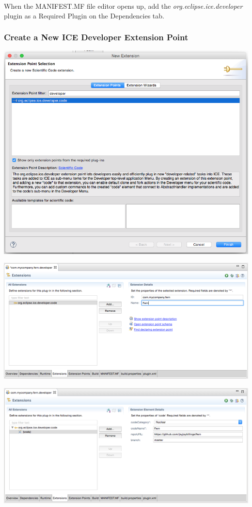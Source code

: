 \documentclass{article}
\begin{document}
When the MANIFEST.MF file editor opens up, add the
\emph{org.eclipse.ice.developer} plugin as a Required Plugin on the Dependencies
tab.

\subsubsection{Create a New ICE Developer Extension Point}
\begin{center}
\includegraphics[width=\textwidth]{figures/extensionPt.png}
\label{fig:createExtPt}
\end{center}

\begin{center}
\includegraphics[width=\textwidth]{figures/extptconfig1.png}
\label{fig:config1}
\end{center}

\begin{center}
\includegraphics[width=\textwidth]{figures/extptconfig2.png}
\label{fig:config2}
\end{center}
\end{document}
